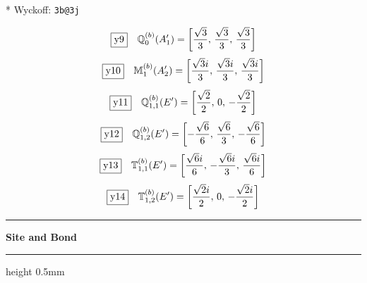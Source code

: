 \documentclass[fleqn,10pt,landscape]{jsarticle}
\begin{document}
\noindent ** Wyckoff: \texttt{3b@3j}

\begin{dmath*}
\fbox{y9}\quad \mathbb{Q}_{0}^{(b)}(A_{1}^{\prime})=\left[ \frac{\sqrt{3}}{3},\, \frac{\sqrt{3}}{3},\, \frac{\sqrt{3}}{3} \right]
\end{dmath*}
\begin{dmath*}
\fbox{y10}\quad \mathbb{M}_{1}^{(b)}(A_{2}^{\prime})=\left[ \frac{\sqrt{3} i}{3},\, \frac{\sqrt{3} i}{3},\, \frac{\sqrt{3} i}{3} \right]
\end{dmath*}
\begin{dmath*}
\fbox{y11}\quad \mathbb{Q}_{1,1}^{(b)}(E^{\prime})=\left[ \frac{\sqrt{2}}{2},\, 0,\, - \frac{\sqrt{2}}{2} \right]
\end{dmath*}
\begin{dmath*}
\fbox{y12}\quad \mathbb{Q}_{1,2}^{(b)}(E^{\prime})=\left[ - \frac{\sqrt{6}}{6},\, \frac{\sqrt{6}}{3},\, - \frac{\sqrt{6}}{6} \right]
\end{dmath*}
\begin{dmath*}
\fbox{y13}\quad \mathbb{T}_{1,1}^{(b)}(E^{\prime})=\left[ \frac{\sqrt{6} i}{6},\, - \frac{\sqrt{6} i}{3},\, \frac{\sqrt{6} i}{6} \right]
\end{dmath*}
\begin{dmath*}
\fbox{y14}\quad \mathbb{T}_{1,2}^{(b)}(E^{\prime})=\left[ \frac{\sqrt{2} i}{2},\, 0,\, - \frac{\sqrt{2} i}{2} \right]
\end{dmath*}
\vspace{5mm}
\noindent \rule[0.5mm]{5mm}{0.5mm}\hspace{3mm}\textbf{Site and Bond}\hspace{3mm}\leaders\hrule height 0.5mm\hfill\kern0pt
\vspace{3mm}
\end{document}
